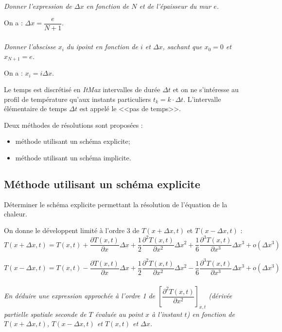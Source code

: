 \documentclass[10pt,fleqn]{article} %
\begin{document}
\subparagraph{\label{q_xini}}\textit{Donner l'expression de $\Delta x$ en fonction de $N$ et de l'épaisseur du mur $e$.}
\ifprof
\begin{corrige}
On a : $\Delta x = \dfrac{e}{N+1}$.
\end{corrige}
\else
\fi


\subparagraph{\label{q_xini2}}\textit{Donner l'abscisse $x_i$ du i\ieme point en fonction de $i$ et $\Delta x$, sachant que $x_0=0$ et  $x_{N+1} = e$.}
\ifprof
\begin{corrige}
On a : $x_i = i \Delta x$.
\end{corrige}
\else
\fi
 
 

Le temps est discrétisé en \textit{ItMax} intervalles de durée $\Delta t$ et on ne s'intéresse au profil de température qu'aux instants particuliers $t_k = k \cdot \Delta t$. L'intervalle élémentaire de temps $\Delta t$ est appelé le <<pas de temps>>.

Deux méthodes de résolutions sont proposées : 
\begin{itemize}
\item méthode utilisant un schéma explicite;
\item méthode utilisant un schéma implicite.
\end{itemize}

\subsection{Méthode utilisant un schéma explicite}

\begin{obj}
Déterminer le schéma explicite permettant la résolution de l'équation de la chaleur.
\end{obj}

On donne le développent limité à l'ordre 3 de $T(x+\Delta x,t)$ et $T(x-\Delta x,t)$ :
$$
T(x+\Delta x,t)=T(x,t)+\dfrac{\partial T(x,t)}{\partial x}\Delta x 
+ \dfrac{1}{2}\dfrac{\partial^2 T(x,t)}{\partial x^2}\Delta x^2
+ \dfrac{1}{6}\dfrac{\partial^3 T(x,t)}{\partial x^3}\Delta x^3
+ o\left( \Delta x^3\right)
$$

$$
T(x-\Delta x,t)=T(x,t)-\dfrac{\partial T(x,t)}{\partial x}\Delta x 
+ \dfrac{1}{2}\dfrac{\partial^2 T(x,t)}{\partial x^2}\Delta x^2
- \dfrac{1}{6}\dfrac{\partial^3 T(x,t)}{\partial x^3}\Delta x^3
+ o\left( \Delta x^3\right)
$$

\subparagraph{}\textit{En déduire une expression approchée à l'ordre 1 de
 $\left[\dfrac{\partial^2 T(x,t)}{\partial x^2}\right]_{x,t}$ (dérivée partielle spatiale seconde de 
 $T$ évaluée au point $x$ à l'instant $t$) en fonction de $T(x+\Delta x,t)$, $T(x-\Delta x,t)$ et 
$T(x,t)$ et $\Delta x$.}
\end{document}
